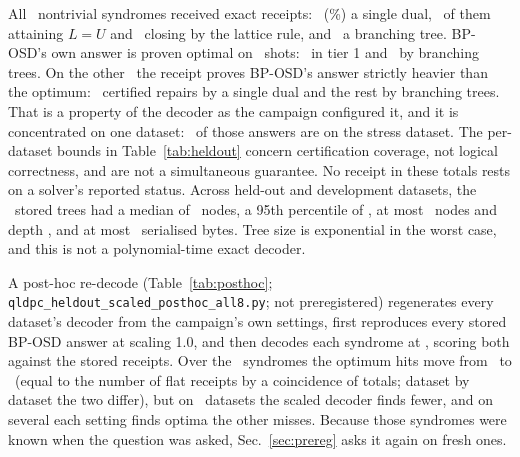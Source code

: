 \documentclass[aps,pra,twocolumn,superscriptaddress,nofootinbib,longbibliography,floatfix]{revtex4-2}
\begin{document}
All \HoNontrivial\ nontrivial syndromes received exact receipts: \RtHoSingleDual\ (\RtHoSingleDualPct\%) a single dual, \RtHoSingleAttaining\ of them attaining $L=U$ and \RtHoSingleLattice\ closing by the lattice rule, and \RtHoBranching\ a branching tree. BP-OSD's own answer is proven optimal on \RtHoBpOptimal\ shots: \RtHoTierOne\ in tier 1 and \RtHoBranchingBpOptimal\ by branching trees. On the other \PaMissUnscaled\ the receipt proves BP-OSD's answer strictly heavier than the optimum: \RtHoTierTwo\ certified repairs by a single dual and the rest by branching trees. That is a property of the decoder as the campaign configured it, and it is concentrated on one dataset: \HoPostStressMissRecorded\ of those answers are on the stress dataset. The per-dataset bounds in Table~\ref{tab:heldout} concern certification coverage, not logical correctness, and are not a simultaneous guarantee. No receipt in these totals rests on a solver's reported status. Across held-out and development datasets, the \TreeCount\ stored trees had a median of \TreeNodesMedian\ nodes, a 95th percentile of \TreeNodesPNinetyFive, at most \TreeNodesMax\ nodes and depth \TreeDepthMax, and at most \TreeBytesMax\ serialised bytes. Tree size is exponential in the worst case, and this is not a polynomial-time exact decoder.

\begin{table}[tbp]
\caption{Post hoc, on the held-out syndromes of Table~\ref{tab:heldout}: optimum hits of BP-OSD at the campaign's scaling factor 1.0 and at \ScaledAlpha, scored against the stored receipts, the shots on which only one setting finds the optimum, and the exact two-sided McNemar $p$ of that split. At 1.0 the decoder reproduces every stored answer.}
\label{tab:posthoc}
\small\setlength{\tabcolsep}{2.5pt}

\end{table}

A post-hoc re-decode (Table~\ref{tab:posthoc}; \texttt{qldpc\_heldout\_scaled\_posthoc\_all8.py}; not preregistered) regenerates every dataset's decoder from the campaign's own settings, first reproduces every stored BP-OSD answer at scaling 1.0, and then decodes each syndrome at \ScaledAlpha, scoring both against the stored receipts. Over the \PaShots\ syndromes the optimum hits move from \PaHitUnscaled\ to \PaHitScaled\ (equal to the number of flat receipts by a coincidence of totals; dataset by dataset the two differ), but on \PaDatasetsScaledFewer\ datasets the scaled decoder finds fewer, and on several each setting finds optima the other misses. Because those syndromes were known when the question was asked, Sec.~\ref{sec:prereg} asks it again on fresh ones.
\end{document}
